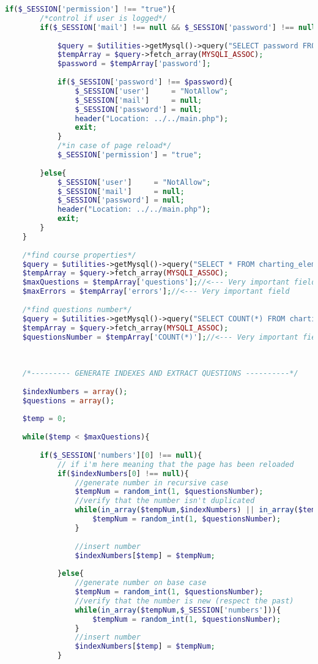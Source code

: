 \begin{lstlisting}[language=php]
	if($_SESSION['permission'] !== "true"){
		/*control if user is logged*/
		if($_SESSION['mail'] !== null && $_SESSION['password'] !== null){
			
			$query = $utilities->getMysql()->query("SELECT password FROM user_table1 WHERE (email = '{$_SESSION['mail']}')");
			$tempArray = $query->fetch_array(MYSQLI_ASSOC);
			$password = $tempArray['password'];
			
			if($_SESSION['password'] !== $password){
				$_SESSION['user']     = "NotAllow";
				$_SESSION['mail']     = null;
				$_SESSION['password'] = null;
				header("Location: ../../main.php");
				exit;
			}
			/*in case of page reload*/
			$_SESSION['permission'] = "true";
			
		}else{
			$_SESSION['user']     = "NotAllow";
			$_SESSION['mail']     = null;
			$_SESSION['password'] = null;
			header("Location: ../../main.php");
			exit;
		}
	}
	
	/*find course properties*/
	$query = $utilities->getMysql()->query("SELECT * FROM charting_elements_properties WHERE (id = '1')");
	$tempArray = $query->fetch_array(MYSQLI_ASSOC);
	$maxQuestions = $tempArray['questions'];//<--- Very important field
	$maxErrors = $tempArray['errors'];//<--- Very important field
	
	/*find questions number*/
	$query = $utilities->getMysql()->query("SELECT COUNT(*) FROM charting_elements");
	$tempArray = $query->fetch_array(MYSQLI_ASSOC);
	$questionsNumber = $tempArray['COUNT(*)'];//<--- Very important field
	
	
	
	/*--------- GENERATE INDEXES AND EXTRACT QUESTIONS ----------*/
	
	$indexNumbers = array();
	$questions = array();
	
	$temp = 0;
	
	while($temp < $maxQuestions){
		
		if($_SESSION['numbers'][0] !== null){
			// if i'm here meaning that the page has been reloaded     
			if($indexNumbers[0] !== null){
				//generate number in recursive case
				$tempNum = random_int(1, $questionsNumber);
				//verify that the number isn't duplicated
				while(in_array($tempNum,$indexNumbers) || in_array($tempNum,$_SESSION['numbers'])){
					$tempNum = random_int(1, $questionsNumber);
				}
				
				//insert number
				$indexNumbers[$temp] = $tempNum; 
				
			}else{
				//generate number on base case
				$tempNum = random_int(1, $questionsNumber);
				//verify that the number is new (respect the past)
				while(in_array($tempNum,$_SESSION['numbers'])){
					$tempNum = random_int(1, $questionsNumber);
				}
				//insert number
				$indexNumbers[$temp] = $tempNum; 
			}
			

\end{lstlisting}
